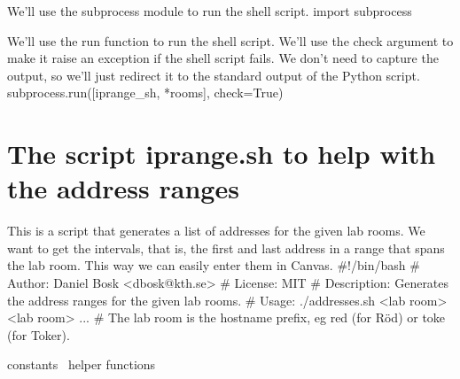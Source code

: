 We'll use the {\Tt{}subprocess\nwendquote} module to run the shell script.
\nwenddocs{}\plusendmoddef\nwstartdeflinemarkup{}\nwenddeflinemarkup
import subprocess
\nwendcode{}\nwdocspar

We'll use the {\Tt{}run\nwendquote} function to run the shell script.
We'll use the {\Tt{}check\nwendquote} argument to make it raise an exception if the shell 
script fails.
We don't need to capture the output, so we'll just redirect it to the standard 
output of the Python script.
\nwenddocs{}\endmoddef\nwstartdeflinemarkup{}\nwenddeflinemarkup
subprocess.run([iprange_sh, *rooms], check=True)
\nwendcode{}\nwdocspar


\section{The script {\Tt{}iprange.sh\nwendquote} to help with the address ranges}

This is a script
that generates a list of addresses for the given lab rooms.
We want to get the intervals, that is, the first and last address in a range 
that spans the lab room.
This way we can easily enter them in Canvas.
\nwenddocs{}\endmoddef\nwstartdeflinemarkup\nwenddeflinemarkup
#!/bin/bash
# Author: Daniel Bosk <dbosk@kth.se>
# License: MIT
# Description: Generates the address ranges for the given lab rooms.
# Usage: ./addresses.sh <lab room> <lab room> ...
# The lab room is the hostname prefix, eg red (for Röd) or toke (for Toker).

\LA{}constants~{\nwtagstyle{}}\RA{}
\LA{}helper functions~{\nwtagstyle{}}\RA{}

